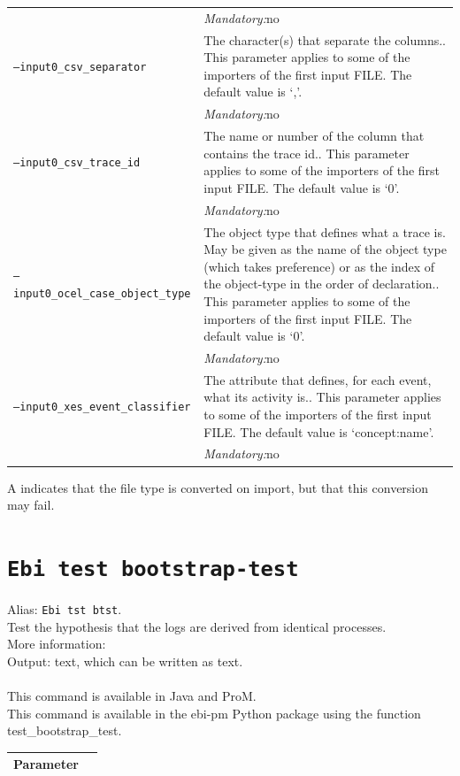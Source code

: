 {\begin{tabularx}{\linewidth}{lX}
&\textit{Mandatory:}\quad no\\
\texttt{--input0\_csv\_separator} & The character(s) that separate the columns.. This parameter applies to some of the importers of the first input FILE. The default value is `,'.\\
&\textit{Mandatory:}\quad no\\
\texttt{--input0\_csv\_trace\_id} & The name or number of the column that contains the trace id.. This parameter applies to some of the importers of the first input FILE. The default value is `0'.\\
&\textit{Mandatory:}\quad no\\
\texttt{--input0\_ocel\_case\_object\_type} & The object type that defines what a trace is. May be given as the name of the object type (which takes preference) or as the index of the object-type in the order of declaration.. This parameter applies to some of the importers of the first input FILE. The default value is `0'.\\
&\textit{Mandatory:}\quad no\\
\texttt{--input0\_xes\_event\_classifier} & The attribute that defines, for each event, what its activity is.. This parameter applies to some of the importers of the first input FILE. The default value is `concept:name'.\\
&\textit{Mandatory:}\quad no\\
\bottomrule
\end{tabularx}
A \textdagger{} indicates that the file type is converted on import, but that this conversion may fail.
\clearpage\section{\texttt{Ebi test bootstrap-test}}
\label{command:Ebi test bootstrap-test}
Alias: \texttt{Ebi tst btst}.\\
Test the hypothesis that the logs are derived from identical processes.\\
More information: \cite{DBLP:journals/tkde/LeemansMPH23}~\\
\noindent Output: text, which can be written as  text.\\
\\This command is available in Java and ProM.
\\This command is available in the ebi-pm Python package using the function test\_bootstrap\_test.
\begin{tabularx}{\linewidth}{lX}
\toprule
Parameter \\\midrule

\end{tabularx}}
